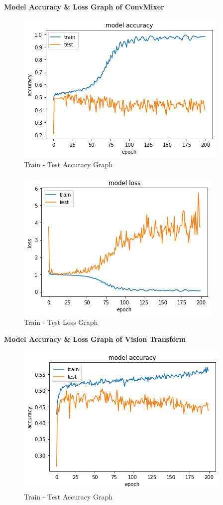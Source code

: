\documentclass{article}
\begin{document}
\textbf{\large Model Accuracy \& Loss Graph of ConvMixer}
\begin{figure}[H]
    \begin{center}
        \includegraphics[scale=0.6]{assets/graphs/accuracy_convmixer.png}
        \caption{Train - Test Accuracy Graph}
    \end{center}
\end{figure}
\begin{figure}[H]
    \begin{center}
        \includegraphics[scale=0.6]{assets/graphs/loss_convmixer.png}
        \caption{Train - Test Loss Graph}
    \end{center}
\end{figure}
\vspace{1.38cm}
\textbf{\large Model Accuracy \& Loss Graph of Vision Transform}
\begin{figure}[H]
    \begin{center}
        \includegraphics[scale=0.6]{assets/graphs/accuracy_vt.png}
        \caption{Train - Test Accuracy Graph}
    \end{center}
\end{figure}
\end{document}
